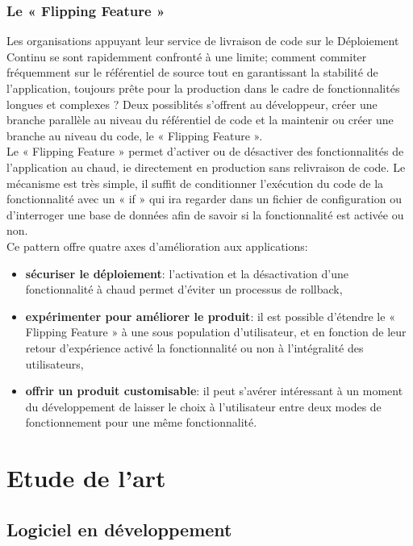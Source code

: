 \documentclass{report}
\begin{document}
        \subsection{Le « Flipping Feature »}
        Les organisations appuyant leur service de livraison de code sur le Déploiement Continu se sont rapidemment confronté à une limite; comment commiter fréquemment sur le référentiel de source tout en garantissant la stabilité de l’application, toujours prête pour la production dans le cadre de fonctionnalités longues et complexes ? Deux possiblités s'offrent au développeur, créer une branche parallèle au niveau du référentiel de code et la maintenir ou créer une branche au niveau du code, le « Flipping Feature ».\\
        Le « Flipping Feature » permet d'activer ou de désactiver des fonctionnalités de l'application au chaud, ie directement en production sans relivraison de code. Le mécanisme est très simple, il suffit de conditionner l'exécution du code de la fonctionnalité avec un « if » qui ira regarder dans un fichier de configuration ou d'interroger une base de données afin de savoir si la fonctionnalité est activée ou non.\\
        Ce pattern offre quatre axes d'amélioration aux applications:\\
        \begin{itemize}
          \item \textbf{sécuriser le déploiement}: l'activation et la désactivation d'une fonctionnalité à chaud permet d'éviter un processus de rollback,
          \item \textbf{expérimenter pour améliorer le produit}: il est possible d'étendre le « Flipping Feature » à une sous population d'utilisateur, et en fonction de leur retour d'expérience activé la fonctionnalité ou non à l'intégralité des utilisateurs,
          \item \textbf{offrir un produit customisable}: il peut s'avérer intéressant à un moment du développement de laisser le choix à l'utilisateur entre deux modes de fonctionnement pour une même fonctionnalité.\\
        \end{itemize}

    \chapter{Etude de l'art}

      \section{Logiciel en développement}
\end{document}
